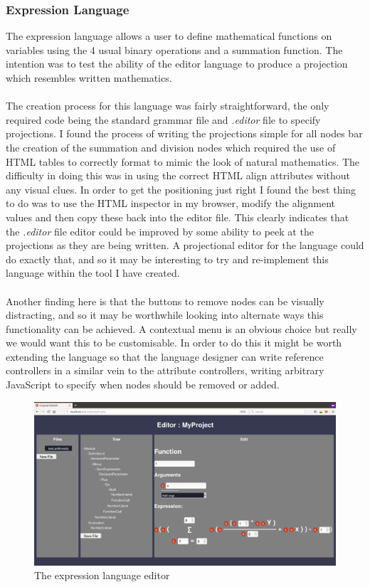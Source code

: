 \documentclass{article}
\begin{document}
\subsubsection{Expression Language}
The expression language allows a user to define mathematical functions on variables using the 4 usual binary operations and a summation function. The intention was to test the ability of the editor language to produce a projection which resembles written mathematics.
\\
\\
The creation process for this language was fairly straightforward, the only required code being the standard grammar file and \emph{.editor} file to specify projections. I found the process of writing the projections simple for all nodes bar the creation  of the summation and division nodes which required the use of HTML tables to correctly format to mimic the look of natural mathematics. The difficulty in doing this was in using the correct HTML align attributes without any visual clues. In order to get the positioning just right I found the best thing to do was to use the HTML inspector in my browser, modify the alignment values and then copy these back into the editor file. This clearly indicates that the \emph{.editor} file editor could be improved by some ability to peek at the projections as they are being written. A projectional editor for the language could do exactly that, and so it may be interesting to try and re-implement this language within the tool I have created.   
\\
\\
Another finding here is that the buttons to remove nodes can be visually distracting, and so it may be worthwhile looking into alternate ways this functionality can be achieved. A contextual menu is an obvious choice but really we would want this to be customisable. In order to do this it might be worth extending the language so that the language designer can write reference controllers in a similar vein to the attribute controllers, writing arbitrary JavaScript to specify when nodes should be removed or added.
\begin{figure}[h!]
  \centering
  \includegraphics[width=\linewidth]{./Screenshots/arithmeticUI2.png}
  \caption{The expression language editor}
  \label{fig:arithmeticUI}
\end{figure}
\end{document}
